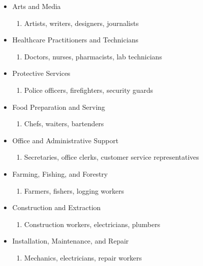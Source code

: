 \begin{enumerate}
\begin{itemize}
        \item Arts and Media
            \begin{enumerate}
                \item Artists, writers, designers, journalists
            \end{enumerate}
        \item Healthcare Practitioners and Technicians
            \begin{enumerate}
                \item Doctors, nurses, pharmacists, lab technicians
            \end{enumerate}
        \item Protective Services
            \begin{enumerate}
                \item Police officers, firefighters, security guards
            \end{enumerate}
        \item Food Preparation and Serving
            \begin{enumerate}
                \item Chefs, waiters, bartenders
            \end{enumerate}
        \item Office and Administrative Support
            \begin{enumerate}
                \item Secretaries, office clerks, customer service representatives
            \end{enumerate}
        \item Farming, Fishing, and Forestry
            \begin{enumerate}
                \item Farmers, fishers, logging workers
            \end{enumerate}
        \item Construction and Extraction
            \begin{enumerate}
                \item Construction workers, electricians, plumbers
            \end{enumerate}
        \item Installation, Maintenance, and Repair
            \begin{enumerate}
                \item Mechanics, electricians, repair workers
            \end{enumerate}

\end{itemize}
\end{enumerate}
